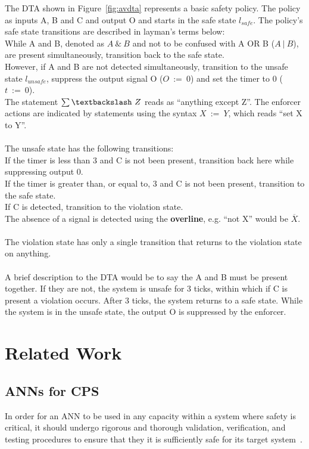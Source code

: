 \begin{example}\label{ex:dta}
	The \ac{DTA} shown in Figure~\ref{fig:avdta} represents a basic safety policy.
	The policy as inputs A, B and C and output O and starts in the safe state $l_{safe}$.
	The policy's safe state transitions are described in layman's terms below: \\
	While A and B, denoted as $A~\&~B$ and not to be confused with A OR B ($A~|~B$), are present simultaneously, transition back to the safe state.\\
	However, if A and B are not detected simultaneously, transition to the unsafe state $l_{unsafe}$, suppress the output signal O ($O~:=~0$) and set the timer to 0 ($t~:=~0$).\\
	The statement $\sum\textbackslash~Z$ reads as ``anything except Z''.
	The enforcer actions are indicated by statements using the syntax $X~:=~Y$, which reads ``set X to Y''.\\
	\\
	The unsafe state has the following transitions:\\
	If the timer is less than 3 and C is not been present, transition back here while suppressing output 0.\\
	If the timer is greater than, or equal to, 3 and C is not been present, transition to the safe state.\\
	If C is detected, transition to the violation state.\\
	The absence of a signal is detected using the \textbf{overline}, e.g. ``not X'' would be $\overline{X}$.\\
	\\
	The violation state has only a single transition that returns to the violation state on anything.\\
	\\
	A brief description to the \ac{DTA} would be to say the A and B must be present together. 
	If they are not, the system is unsafe for 3 ticks, within which if C is present a violation occurs.
	After 3 ticks, the system returns to a safe state.
	While the system is in the unsafe state, the output O is suppressed by the enforcer.
\end{example}

\section{Related Work}
\subsection{\acfp{ANN} for \acf{CPS}}
In order for an \ac{ANN} to be used in any capacity within a system where safety is critical, it should undergo rigorous and thorough validation, verification, and testing procedures to ensure that they it is sufficiently safe for its target system~\cite{scann, ANNSafetyLifecycle2003}. 

